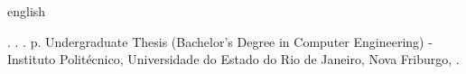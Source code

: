 
\begin{resumo}[Abstract]
\begin{otherlanguage*}{english}
\begin{SingleSpace}

\noindent
\begin{flushleft}
\entradaAutor{}. \textit{\englishTitle{}}. \the\year. \pageref{LastPage} p. Undergraduate Thesis (Bachelor's Degree in Computer Engineering) - Instituto Politécnico, Universidade do Estado do Rio de Janeiro, Nova Friburgo, \the\year.
\end{flushleft}
\vspace{\onelineskip}

\setlength{\parindent}{1.3cm}


\end{SingleSpace}
\end{otherlanguage*}
\end{resumo}
